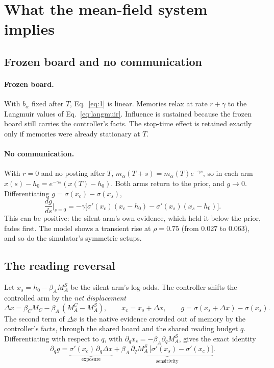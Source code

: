 \documentclass[10pt,a4paper]{article}
\theoremstyle{definition}
\begin{document}
\section{What the mean-field system implies}
\label{sec:analysis}
\subsection{Frozen board and no communication}
\paragraph{Frozen board.} With $b_\alpha$ fixed after $T$, Eq.~\eqref{eq:1} is linear. Memories relax at rate $r+\gamma$
to the Langmuir values of Eq.~\eqref{eq:langmuir}. Influence is sustained because the frozen board still carries the
controller's facts. The stop-time effect is retained exactly only if memories were already stationary at $T$.

\paragraph{No communication.} With $r=0$ and no posting after $T$, $m_\alpha(T+s)=m_\alpha(T)e^{-\gamma s}$, so in each
arm $x(s)-h_0=e^{-\gamma s}(x(T)-h_0)$. Both arms return to the prior, and $g\to0$. Differentiating $g=\sigma(x_c)-\sigma(x_s)$,
\begin{equation}
\frac{dg}{ds}\Big|_{s=0}=-\gamma\Big[\sigma'(x_c)(x_c-h_0)-\sigma'(x_s)(x_s-h_0)\Big].
\end{equation}
This can be positive: the silent arm's own evidence, which held it below the prior, fades first. The model shows a
transient rise at $\rho=0.75$ (from 0.027 to 0.063), and so do the simulator's symmetric setups.

\subsection{The reading reversal}
\label{sec:reversal}
Let $x_s=h_0-\beta_A M_A^S$ be the silent arm's log-odds. The controller shifts the controlled arm by the \emph{net
displacement}
\begin{equation}
\Delta x=\beta_C M_C-\beta_A\,(M_A^C-M_A^S),\qquad x_c=x_s+\Delta x,\qquad g=\sigma(x_s+\Delta x)-\sigma(x_s).
\end{equation}
The second term of $\Delta x$ is the native evidence crowded out of memory by the controller's facts, through the
shared board and the shared reading budget $q$. Differentiating with respect to $q$, with
$\partial_q x_s=-\beta_A\partial_q M_A^S$, gives the exact identity
\begin{equation}
\partial_q g=\underbrace{\sigma'(x_c)\,\partial_q\Delta x}_{\text{exposure}}
+\underbrace{\beta_A\,\partial_q M_A^S\,\big[\sigma'(x_s)-\sigma'(x_c)\big]}_{\text{sensitivity}}.\label{eq:rev}
\end{equation}
\end{document}
